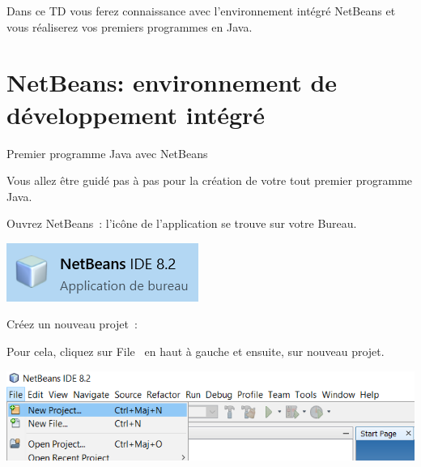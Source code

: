 \documentclass[a4paper,11pt]{article}
\date{2018 -- 2019}
\begin{document}
\entete
\titre

\lastedit


	Dans ce TD vous ferez connaissance avec l'environnement intégré NetBeans et 
	vous réaliserez vos premiers programmes en Java.

	\tableofcontents

	\newpage

\section{NetBeans: environnement de développement intégré }

	\begin{Tutoriel}{Premier programme Java avec NetBeans}
	
	Vous allez être guidé pas à pas pour la création de votre tout premier programme Java.
	
	\begin{steps}
		\item Ouvrez NetBeans~:
			l'icône de l'application se trouve sur votre Bureau. 
		
			\bigskip
			\begin{center}
				\includegraphics{images/nb_icone}
			\end{center}


		\item Créez un nouveau projet~: 
		
			Pour cela, cliquez sur \og File \fg~en haut à gauche et ensuite, sur nouveau projet. 
			
			\bigskip
			\begin{center}
				\includegraphics[width=\textwidth]{images/nb_newproject}
			\end{center}
			

\end{steps}
\end{Tutoriel}
\end{document}
